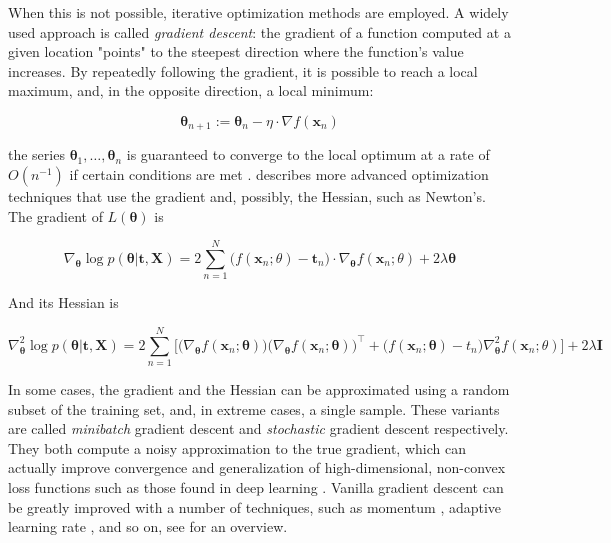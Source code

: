 \documentclass[12pt]{book}
\begin{document}
When this is not possible, iterative optimization methods are employed. A widely used approach is called \emph{gradient descent}: the gradient of a function computed at a given location "points" to the steepest direction where the function's value increases. By repeatedly following the gradient, it is possible to reach a local maximum, and, in the opposite direction, a local minimum:

\begin{equation}
\bm\theta_{n+1}:=\bm\theta_n-\eta\cdot\nabla f(\bm x_n)
\end{equation}

the series $\bm\theta_1,\ldots,\bm\theta_n$ is guaranteed to converge to the local optimum at a rate of $O(n^{-1})$ if certain conditions are met \citep{gd_convergence}. \cite{numopt} describes more advanced optimization techniques that use the gradient and, possibly, the Hessian, such as Newton's. The gradient of $L(\bm\theta)$ is

\begin{equation}
\label{eq:least_squares_gradient}
\nabla_{\bm\theta}\log p(\bm\theta\vert\bm t,\bm X)
=2\sum_{n=1}^N \big(f(\bm x_n;\theta)-\bm t_n\big)\cdot\nabla_{\bm\theta}f(\bm x_n;\theta) + 2\lambda\bm\theta
\end{equation}

And its Hessian is

\begin{equation}
\label{eq:least_squares_hessian}
\nabla^2_{\bm\theta}\log p(\bm\theta\vert\bm t,\bm X)=2\sum_{n=1}^{N}\bigg[
\big(\nabla_{\bm\theta} f(\bm x_n;\bm\theta)\big)
\big(\nabla_{\bm\theta} f(\bm x_n;\bm\theta)\big)^\intercal
+\big(f(\bm x_n;\bm\theta)-t_n\big)\nabla^2_{\bm\theta}f(\bm x_n;\theta)\bigg]+2\lambda\bm I
\end{equation}

In some cases, the gradient and the Hessian can be approximated using a random subset of the training set, and, in extreme cases, a single sample. These variants are called \emph{minibatch} gradient descent and \emph{stochastic} gradient descent respectively. They both compute a noisy approximation to the true gradient, which can actually improve convergence and generalization of high-dimensional, non-convex loss functions such as those found in deep learning \citep{sgd_noise, bayesian_sgd}. Vanilla gradient descent can be greatly improved with a number of techniques, such as momentum \citep{gd_momentum}, adaptive learning rate \citep{adagrad, adadelta, adam}, and so on, see \cite{gd_overview} for an overview. 
\end{document}
